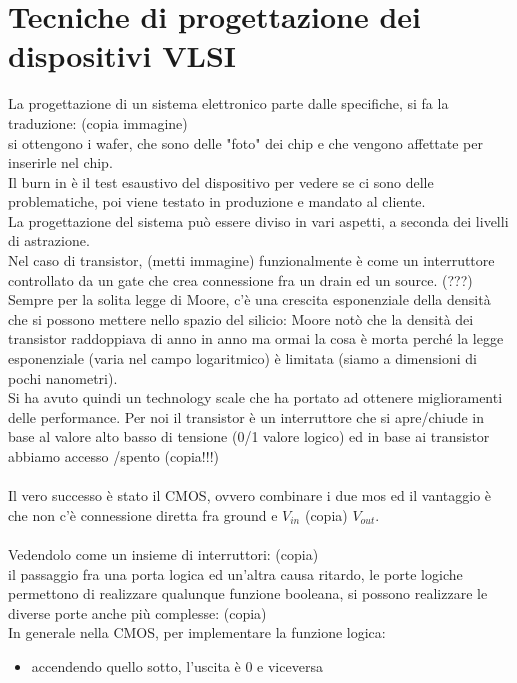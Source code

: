 \documentclass[oneside, 12pt]{extbook}
\begin{document}
\section{Tecniche di progettazione dei dispositivi VLSI}
La progettazione di un sistema elettronico parte dalle specifiche, si fa la traduzione: (copia immagine)\\si ottengono i wafer, che sono delle "foto" dei chip e che vengono affettate per inserirle nel chip.\\Il burn in è il test esaustivo del dispositivo per vedere se ci sono delle problematiche, poi viene testato in produzione e mandato al cliente.\\La progettazione del sistema può essere diviso in vari aspetti, a seconda dei livelli di astrazione.\\Nel caso di transistor, (metti immagine) funzionalmente è come un interruttore controllato da un gate che crea connessione fra un drain ed un source. (???)\\Sempre per la solita legge di Moore, c'è una crescita esponenziale della densità che si possono mettere nello spazio del silicio: Moore notò che la densità dei transistor raddoppiava di anno in anno ma ormai la cosa è morta perché la legge esponenziale (varia nel campo logaritmico) è limitata (siamo a dimensioni di pochi nanometri).\\Si ha avuto quindi un technology scale che ha portato ad ottenere miglioramenti delle performance. Per noi il transistor è un interruttore che si apre/chiude in base al valore alto basso di tensione (0/1 valore logico) ed in base ai transistor abbiamo accesso /spento (copia!!!)\\\\Il vero successo è stato il CMOS, ovvero combinare i due mos ed il vantaggio è che non c'è connessione diretta fra ground e $V_{in}$ (copia) $V_{out}$.\\\\Vedendolo come un insieme di interruttori: (copia)\\ il passaggio fra una porta logica ed un'altra causa ritardo, le porte logiche permettono di realizzare qualunque funzione booleana, si possono realizzare le diverse porte anche più complesse: (copia)\\In generale nella CMOS, per implementare la funzione logica:
\begin{itemize}
	\item accendendo quello sotto, l'uscita è 0 e viceversa
\end{itemize}
\end{document}
